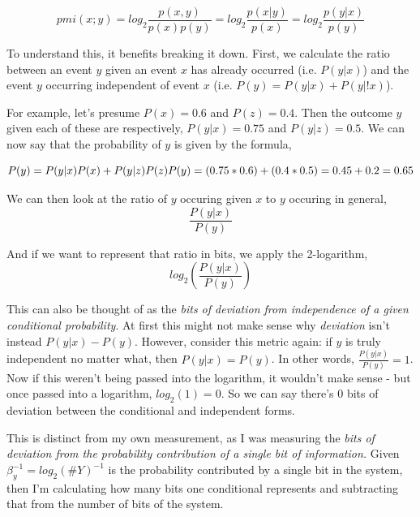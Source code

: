 \documentclass{article}
\begin{document}
\begin{equation}
pmi(x;y) = log_{2} \frac{p(x,y)}{p(x)p(y)} = log_{2} \frac{p(x|y)}{p(x)} = log_{2} \frac{p(y|x)}{p(y)}
\end{equation}

To understand this, it benefits breaking it down. First, we calculate the ratio between an event $y$ given an event $x$ has already occurred (i.e. $P(y|x)$) and the event $y$ occurring independent of event $x$ (i.e. $P(y) = P(y|x) + P(y|!x)$).

For example, let’s presume $P(x) = 0.6$ and $P(z) = 0.4$. Then the outcome $y$ given each of these are respectively, $P(y|x) = 0.75$ and $P(y|z) = 0.5$. We can now say that the probability of $y$ is given by the formula,

\begin{equation}
P(y) = P(y|x)P(x) + P(y|z)P(z)\\P(y) = (0.75 * 0.6) + (0.4 * 0.5) = 0.45 + 0.2 = 0.65
\end{equation}

We can then look at the ratio of $y$ occuring given $x$ to $y$ occuring in general,
\begin{equation}
\frac{P(y|x)}{P(y)}
\end{equation}

And if we want to represent that ratio in bits, we apply the 2-logarithm,
\begin{equation}
log_2(\frac{P(y|x)}{P(y)})
\end{equation}

This can also be thought of as the \textit{bits of deviation from independence of a given conditional probability}. At first this might not make sense why \textit{deviation} isn’t instead $P(y|x) - P(y)$. However, consider this metric again: if $y$ is truly independent no matter what, then $P(y|x) = P(y)$. In other words, $\frac{P(y|x)}{P(y)} = 1$. Now if this weren’t being passed into the logarithm, it wouldn’t make sense - but once passed into a logarithm, $log_2(1) = 0$. So we can say there’s 0 bits of deviation between the conditional and independent forms.

This is distinct from my own measurement, as I was measuring the \textit{bits of deviation from the probability contribution of a single bit of information.} Given $\beta_{y}^{-1} = log_2(\#Y)^{-1}$ is the probability contributed by a single bit in the system, then I’m calculating how many bits one conditional represents and subtracting that from the number of bits of the system.
\end{document}
